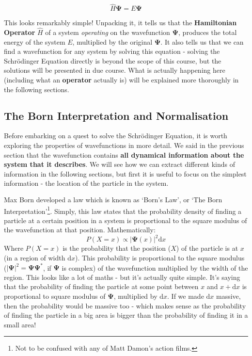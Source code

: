 \documentclass{memoir}[11pt,oneside,a4paper,openany]
\newcommand{\wf}{\ensuremath{\bm{\Psi}}\xspace}
\begin{document}
\begin{equation}\label{eq:tise}
	\hat{H}\wf = E\wf
\end{equation}

This looks remarkably simple! Unpacking it, it tells us that the \textbf{Hamiltonian Operator} $\hat{H}$ of a system \emph{operating} on the wavefunction \wf, produces the total energy of the system $E$, multiplied by the original \wf. It also tells us that we can find a wavefunction for any system by solving this equation - solving the Schr{\"o}dinger Equation directly is beyond the scope of this course, but the solutions will be presented in due course. What is actually happening here (including what an \textbf{operator} actually is) will be explained more thoroughly in the following sections. 

\subsection{The Born Interpretation and Normalisation}
Before embarking on a quest to solve the Schr{\"o}dinger Equation, it is worth exploring the properties of wavefunctions in more detail. We said in the previous section that the wavefunction contains \textbf{all dynamical information about the system that it describes}. We will see how we can extract different kinds of information in the following sections, but first it is useful to focus on the simplest information - the location of the particle in the system. 

Max Born developed a law which is known as `Born's Law', or `The Born Interpretation'\footnote{Not to be confused with any of Matt Damon's action films.}. Simply, this law states that the probability density of finding a particle at a certain position in a system is proportional to the square modulus of the wavefunction at that position. Mathematically:
\begin{equation}
	P(X=x) \propto \lvert \wf(x) \rvert ^2 \mathrm{d}x 
\end{equation}
Where $P(X=x)$ is the probability that the position ($X$) of the particle is at $x$ (in a region of width $\mathrm{d}x$). This probability is proportional to the square modulus ($\lvert \wf \rvert ^2 = \wf \wf^*$, if $\wf$ is complex) of the wavefunction multiplied by the width of the region. This looks like a lot of maths - but it's actually quite simple. It's saying that the probability of finding the particle at some point between $x$ and $x+\mathrm{d}x$ is proportional to square modulus of \wf, multiplied by $\mathrm{d}x$. If we made $\mathrm{d}x$ massive, then the probability would be massive too - which makes sense as the probability of finding the particle in a big area is bigger than the probability of finding it in a small area! 
\end{document}

